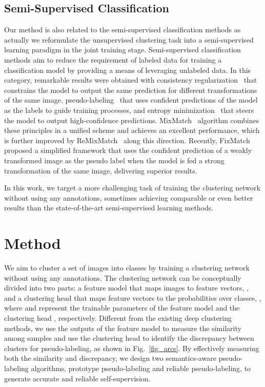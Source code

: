 \documentclass[journal]{IEEEtran}
\begin{document}
\subsection{Semi-Supervised Classification}
Our method is also related to the semi-supervised classification methods as actually we reformulate the unsupervised clustering task into a semi-supervised learning paradigm in the joint training stage.
Semi-supervised classification methods aim to reduce the requirement of labeled data for training a classification model by providing a means of leveraging unlabeled data. In this category, remarkable results were obtained with consistency regularization~\cite{NIPS2016_30ef30b6, DBLP} that constrains the model to output the same prediction for different transformations of the same image, pseudo-labeling~\cite{pseudo} that uses confident predictions of the model as the labels to guide training processes, and entropy minimization~\cite{NIPS2004_96f2b50b, pseudo} that steers the model to output high-confidence predictions. MixMatch~\cite{mixmatch} algorithm combines these principles in a unified scheme and achieves an excellent performance, which is further improved by ReMixMatch~\cite{remixmatch} along this direction. Recently, FixMatch~\cite{fixmatch} proposed a simplified framework that uses the confident prediction of a weakly transformed image as the pseudo label when the model is fed a strong transformation of the same image, delivering superior results.

In this work, we target a more challenging task of training the clustering network without using any annotations, sometimes achieving comparable or even better results than the state-of-the-art semi-supervised learning methods.

\section{Method}
We aim to cluster a set of  images  into  classes by training a clustering network without using any annotations.
The clustering network can be conceptually divided into two parts: a feature model that maps images to feature vectors, , and a clustering head that maps feature vectors to the probabilities over  classes, , where  and  represent the trainable parameters of the feature model  and the clustering head , respectively.
Different from the existing deep clustering methods, we use the outputs of  the feature model to measure the similarity among samples and use the clustering head to identify the discrepancy between clusters for pseudo-labeling, as shown in Fig.~\ref{fig_arcs}.
By effectively measuring both the similarity and discrepancy, we design two semantics-aware pseudo-labeling algorithms, prototype pseudo-labeling and reliable pseudo-labeling, to generate accurate and reliable self-supervision.
\end{document}
